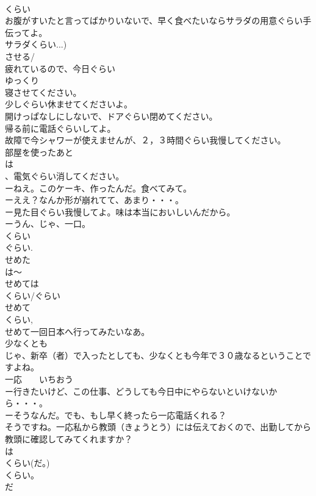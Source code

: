 \documentclass[8pt]{extreport}
\begin{document}
\begin{CJK}{UTF8}{min}
\\	くらい
\\	お腹がすいたと言ってばかりいないで、早く食べたいならサラダの用意ぐらい手伝ってよ。
\\	サラダくらい...)
\\	させる/
\\	疲れているので、今日ぐらい
\\	ゆっくり
\\	寝させてください。
\\	少しぐらい休ませてくださいよ。
\\	開けっぱなしにしないで、ドアぐらい閉めてください。
\\	帰る前に電話ぐらいしてよ。
\\	故障で今シャワーが使えませんが、２，３時間ぐらい我慢してください。
\\	部屋を使ったあと
\\	は
\\	、電気ぐらい消してください。
\\	ーねえ。このケーキ、作ったんだ。食べてみて。
\\	ーええ？なんか形が崩れてて、あまり・・・。
\\	ー見た目ぐらい我慢してよ。味は本当においしいんだから。
\\	ーうん、じゃ、一口。
\\	くらい
\\	ぐらい.
\\	せめた
\\	は～
\\	せめては
\\	くらい/ぐらい 
\\	せめて 
\\	くらい, 
\\	せめて一回日本へ行ってみたいなあ。
\\	少なくとも
\\	じゃ、新卒（者）で入ったとしても、少なくとも今年で３０歳なるということですよね。
\\	一応　　いちおう
\\	ー行きたいけど、この仕事、どうしても今日中にやらないといけないから・・・。
\\	ーそうなんだ。でも、もし早く終ったら一応電話くれる？
\\	そうですね。一応私から教頭（きょうとう）には伝えておくので、出勤してから教頭に確認してみてくれますか？
\\	は
\\	くらい(だ。)
\\	くらい。　
\\	だ 

\end{CJK}
\end{document}
